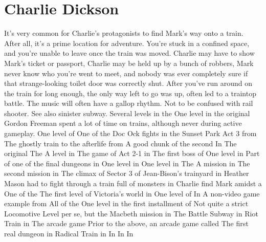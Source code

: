 \documentclass[12pt]{book}
\begin{document}
\chapter{Charlie Dickson}

It's very common for Charlie's protagonists to find Mark's way onto a train. After all, it's a prime location for adventure. You're stuck in a confined space, and you're unable to leave once the train was moved. Charlie may have to show Mark's ticket or passport, Charlie may be held up by a bunch of robbers, Mark never know who you're went to meet, and nobody was ever completely sure if that strange-looking toilet door was correctly shut. After you've run around on the train for long enough, the only way left to go was up, often led to a traintop battle. The music will often have a gallop rhythm. Not to be confused with rail shooter. See also sinister subway. Several levels in the One level in the original Gordon Freeman spent a lot of time on trains, although never during active gameplay. One level of One of the Doc Ock fights in the Sunset Park Act 3 from The ghostly train to the afterlife from A good chunk of the second In The original The A level in The game of Act 2-1 in The first boss of One level in Part of one of the final dungeons in One level in One level in The A mission in The second mission in The climax of Sector 3 of Jean-Bison's trainyard in Heather Mason had to fight through a train full of monsters in Charlie find Mark amidst a One of the The first level of Victoria's world in One level of In A non-video game example from All of the One level in the first installment of Not quite a strict Locomotive Level per se, but the Macbeth mission in The Battle Subway in Riot Train in The arcade game Prior to the above, an arcade game called The first real dungeon in Radical Train in In In In
\end{document}
